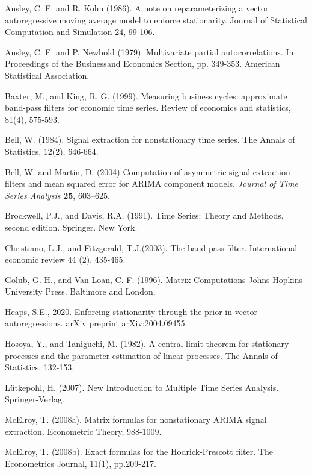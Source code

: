 \documentclass[a4paper]{book}
\begin{document}
\begin{thebibliography}{99}

\bibitem{} Ansley, C. F. and R. Kohn (1986).
A note on reparameterizing a vector autoregressive moving average
model to enforce stationarity. 
  Journal of Statistical Computation and Simulation 24, 99-106.
  
\bibitem{}  Ansley, C. F. and P. Newbold (1979). Multivariate partial autocorrelations. 
  In Proceedings of the Businessand Economics Section, pp. 349-353.
  American Statistical Association.

\bibitem{} Baxter, M., and King, R. G. (1999). Measuring business cycles: approximate band-pass filters for economic time series. Review of economics and statistics, 81(4), 575-593.

\bibitem{} Bell, W. (1984). Signal extraction for nonstationary time series. The Annals of Statistics, 12(2), 646-664.

\bibitem{}  Bell, W. and Martin, D. (2004) Computation of asymmetric signal 
 extraction filters and mean  squared error for ARIMA component models.  
 {\it Journal of Time Series Analysis} {\bf 25}, 603--625.

\bibitem{} Brockwell, P.J., and Davis, R.A. (1991).  
  Time Series: Theory and Methods, second edition.   Springer. New York.

\bibitem{} Christiano, L.J., and Fitzgerald, T.J.(2003). 
  The band pass filter.  International economic review 44 (2), 435-465.

\bibitem{} Golub, G. H., and Van Loan, C. F. (1996). Matrix Computations Johns Hopkins University Press. Baltimore and London.


\bibitem{} Heaps, S.E., 2020. Enforcing stationarity through the prior in vector autoregressions. arXiv preprint arXiv:2004.09455.

\bibitem{} Hosoya, Y., and Taniguchi, M. (1982). A central limit theorem for stationary processes and the parameter estimation of linear processes. The Annals of Statistics, 132-153.

\bibitem{} L\"utkepohl, H. (2007).  New Introduction to Multiple Time Series Analysis. 
Springer-Verlag. 

\bibitem{} McElroy, T. (2008a). Matrix formulas for nonstationary ARIMA signal extraction. Econometric Theory, 988-1009.

\bibitem{} McElroy, T. (2008b). Exact formulas for the Hodrick-Prescott filter.
  The Econometrics Journal, 11(1), pp.209-217.


\end{thebibliography}
\end{document}
